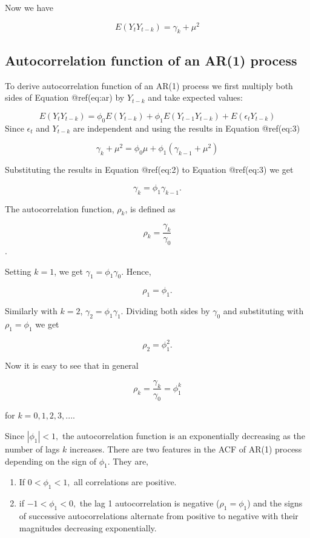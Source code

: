 \documentclass[
  11pt,
  a4paper,
]{report}
\begin{document}
Now we have

\begin{equation}
  E(Y_t Y_{t-k}) = \gamma_k + \mu^2
\end{equation}

\subsection{Autocorrelation function of an AR(1)
process}\label{autocorrelation-function-of-an-ar1-process}

To derive autocorrelation function of an AR(1) process we first multiply
both sides of Equation @ref(eq:ar) by \(Y_{t-k}\) and take expected
values:

\[E(Y_tY_{t-k})=\phi_0E(Y_{t-k})+\phi_1 E(Y_{t-1}Y_{t-k})+E(\epsilon_tY_{t-k})\]
Since \(\epsilon_t\) and \(Y_{t-k}\) are independent and using the
results in Equation @ref(eq:3)

\[\gamma_k + \mu^2 = \phi_0 \mu+\phi_1(\gamma_{k-1}+\mu^2)\]

Substituting the results in Equation @ref(eq:2) to Equation @ref(eq:3)
we get

\begin{equation}
\gamma_k = \phi_1 \gamma_{k-1}.
\end{equation}

The autocorrelation function, \(\rho_k\), is defined as

\[\rho_k = \frac{\gamma_k}{\gamma_0}\].

Setting \(k=1\), we get \(\gamma_1 = \phi_1\gamma_0.\) Hence,

\[\rho_1=\phi_1.\]

Similarly with \(k=2\), \(\gamma_2 = \phi_1 \gamma_1\). Dividing both
sides by \(\gamma_0\) and substituting with \(\rho_1=\phi_1\) we get

\[\rho_2=\phi_1^2.\]

Now it is easy to see that in general

\begin{equation}
\rho_k = \frac{\gamma_k}{\gamma_0}=\phi_1^k 
\end{equation}

for \(k=0, 1, 2, 3, ...\).

Since \(|\phi_1| < 1,\) the autocorrelation function is an exponentially
decreasing as the number of lags \(k\) increases. There are two features
in the ACF of AR(1) process depending on the sign of \(\phi_1\). They
are,

\begin{enumerate}
\def\labelenumi{\arabic{enumi}.}
\item
  If \(0 < \phi_1 < 1,\) all correlations are positive.
\item
  if \(-1 < \phi_1 < 0,\) the lag 1 autocorrelation is negative
  (\(\rho_1=\phi_1\)) and the signs of successive autocorrelations
  alternate from positive to negative with their magnitudes decreasing
  exponentially.
\end{enumerate}
\end{document}
